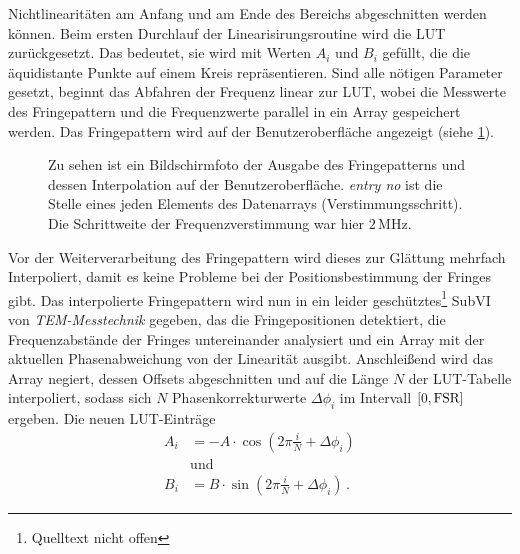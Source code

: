Nichtlinearitäten am Anfang und am Ende des Bereichs abgeschnitten werden
können. Beim ersten Durchlauf der Linearisirungsroutine wird die LUT
zurückgesetzt. Das bedeutet, sie wird mit Werten $A_i$ und $B_i$ gefüllt, die
die äquidistante Punkte auf einem Kreis repräsentieren. Sind alle nötigen
Parameter gesetzt, beginnt das Abfahren der Frequenz linear zur LUT, wobei die
Messwerte des Fringepattern und die Frequenzwerte parallel in ein Array
gespeichert werden. Das Fringepattern wird auf der
Benutzeroberfläche angezeigt (siehe
\ref{fig:linearisierung_benutzeroberflaeche_fringepattern}).\par
\begin{figure}[h]
 	\centering
	\caption[Benutzeroberfläche Linearisierung -
	Fringepattern]{Zu sehen ist ein Bildschirmfoto der Ausgabe des Fringepatterns
	und dessen Interpolation auf der Benutzeroberfläche.
	\textit{entry no} ist die Stelle eines jeden Elements des
	Datenarrays (Verstimmungsschritt).
	Die Schrittweite der Frequenzverstimmung war hier
	$2\,$MHz.}\label{fig:linearisierung_benutzeroberflaeche_fringepattern}
\end{figure}
Vor der Weiterverarbeitung des Fringepattern wird dieses zur Glättung mehrfach
Interpoliert, damit es keine Probleme bei der Positionsbestimmung der Fringes
gibt. Das interpolierte Fringepattern wird nun in ein leider
geschütztes\footnote{Quelltext nicht offen} SubVI von \textit{TEM-Messtechnik}
gegeben, das die Fringepositionen detektiert, die Frequenzabstände der Fringes
untereinander analysiert und ein Array mit der aktuellen Phasenabweichung von
der Linearität ausgibt. Anschleißend wird das Array negiert, dessen Offsets
abgeschnitten und auf die Länge $N$ der LUT-Tabelle interpoliert, sodass sich
$N$ Phasenkorrekturwerte $\Delta\phi_i$ im Intervall
$[0,\text{\lstinline|FSR|}]$ ergeben. Die neuen LUT-Einträge
\begin{equation}\label{eq:LUT_korrektur_01}
	\begin{split}
		A_i&=-A\cdot\cos{\left(2\pi\frac{i}{N}+\Delta\phi_i\right)}\\
		&\text{und}\\
		B_i&=B\cdot\sin{\left(2\pi\frac{i}{N}+\Delta\phi_i\right)}\,.
	\end{split}
\end{equation}
